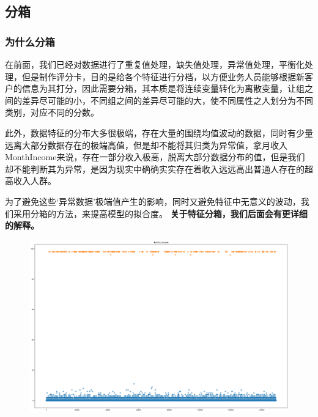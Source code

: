 \documentclass[12pt]{article}
\begin{document}
\newpage
\subsection{分箱}

\subsubsection{为什么分箱}
\begin{flushleft}
	\noindent\qquad 在前面，我们已经对数据进行了重复值处理，缺失值处理，异常值处理，平衡化处理，但是制作评分卡，目的是给各个特征进行分档，以方便业务人员能够根据新客户的信息为其打分，因此需要分箱，其本质是将连续变量转化为离散变量，让组之间的差异尽可能的小，不同组之间的差异尽可能的大，使不同属性之人划分为不同类别，对应不同的分数。\par
	\noindent\qquad 此外，数据特征的分布大多很极端，存在大量的围绕均值波动的数据，同时有少量远离大部分数据存在的极端高值，但是却不能将其归类为异常值，拿月收入MonthIncome来说，存在一部分收入极高，脱离大部分数据分布的值，但是我们却不能判断其为异常，是因为现实中确确实实存在着收入远远高出普通人存在的超高收入人群。\par
	\noindent\qquad 为了避免这些‘异常数据’极端值产生的影响，同时又避免特征中无意义的波动，我们采用分箱的方法，来提高模型的拟合度。
	\noindent\qquad \textbf{关于特征分箱，我们后面会有更详细的解释。}
	
\end{flushleft}
\vspace{2cm}
\begin{figure}[H]
	\centering
	\includegraphics[width=1\linewidth]{figures/MI}
	\caption{}
\end{figure}
\newpage
\end{document}
